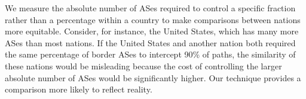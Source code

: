We measure the absolute number of ASes required to control a specific
fraction rather than a percentage within a country to make
comparisons between nations more equitable.
Consider, for instance, the United States, which has many more ASes than
most nations. If the United States and another nation both required the same
percentage of border ASes to intercept 90\% of paths, the similarity of these
nations would be misleading because the cost of controlling the larger absolute number of ASes
would be significantly higher. Our technique provides a comparison more likely to
reflect reality. 
